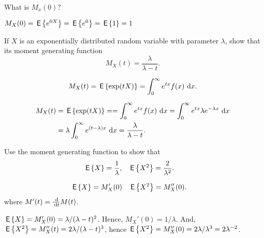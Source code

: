 \begin{exercise}
  What is $M_x(0)?$
  \begin{solution}
    $M_X(0) = \,\mathsf{E}\left\{e^{0 X}\right\} = \,\mathsf{E}\left\{e^0\right\} = \,\mathsf{E}\left\{1\right\} = 1$
  \end{solution}
\end{exercise}

\begin{exercise}\label{ex:33}
 If $X$ is an exponentially distributed random variable with
    parameter $\lambda$, show that its moment generating function
    \begin{equation*}
    M_X(t) = \frac{\lambda}{\lambda-t}.
    \end{equation*}
   \begin{hint}
    \begin{equation*}
      M_X(t) = \,\mathsf{E}\left\{\exp(t X)\right\} =\int_0^\infty e^{tx} f(x) \,\,\text{d}x.
\end{equation*}
\end{hint}
    \begin{solution}
    \begin{equation*}
      \begin{split}
      M_X(t) &= \,\mathsf{E}\left\{\exp(t X)\right\} = 
=\int_0^\infty e^{tx} f(x) \,\,\text{d}x 
=\int_0^\infty e^{tx} \lambda e^{-\lambda x} \,\,\text{d}x  \\
&=\lambda \int_0^\infty e^{(t-\lambda)x} \,\,\text{d}x 
=\frac{\lambda}{\lambda -t}.
      \end{split}
    \end{equation*}
    \end{solution}
  \end{exercise}

\begin{exercise}
    Use the moment generating function to show that 
    \begin{align*}
      \,\mathsf{E}\left\{X\right\} &=\frac1\lambda, & 
      \,\mathsf{E}\left\{X^2\right\} &=\frac2{\lambda^2}.
    \end{align*}
\begin{hint}
    \begin{align*}
      \,\mathsf{E}\left\{X\right\} &= M_X'(0) &  \,\mathsf{E}\left\{X^2\right\} &= M_X''(0).
    \end{align*}
where $M'(t) = \frac{\d}{\d t} M(t)$. 
\end{hint}
\begin{solution}
  $\,\mathsf{E}\left\{X\right\} = M_X'(0)=\lambda/(\lambda-t)^2$. Hence, $M_X'(0)=1/\lambda$. And, $\,\mathsf{E}\left\{X^2\right\} = M_X''(t)=2\lambda/(\lambda-t)^3$, hence $\,\mathsf{E}\left\{X^2\right\}=M_X''(0)=2\lambda/\lambda^3=2\lambda^{-2}$. 
\end{solution}
  \end{exercise}

